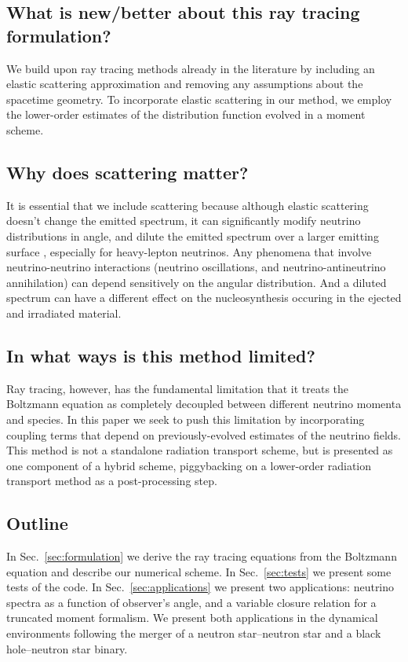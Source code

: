 \documentclass[aps,prd,twocolumn,superscriptaddress,groupedaddress]{revtex4}
\newcommand{\todo}[1]{\marginpar{\tiny{\textcolor{red}{#1}}}}
\begin{document}
\subsection{What is new/better about this ray tracing formulation?}
We build upon ray tracing methods already in the literature
\citep{hari2010-gr_nunubar_collapsar, youn2012-gr_radiative_transfer,
  kova2011-gr_ray_tracing, ?}
by including an elastic scattering approximation
\todo{and perhaps inelastic}
and removing any assumptions about the spacetime geometry.
To incorporate elastic scattering in our method, we employ the lower-order
estimates of the distribution function evolved in a moment scheme.

\subsection{Why does scattering matter?}
It is essential that we include scattering because although elastic scattering
doesn't change the emitted spectrum, it can significantly modify neutrino
distributions in angle, and dilute the emitted spectrum over a larger emitting
surface \citep{pere2016-asl}, especially for heavy-lepton neutrinos.
Any phenomena that involve neutrino-neutrino interactions (neutrino oscillations,
and neutrino-antineutrino annihilation) can depend sensitively on the angular
distribution.
And a diluted spectrum can have a different effect on the nucleosynthesis
occuring in the ejected and irradiated material.

\subsection{In what ways is this method limited?}
Ray tracing, however, has the fundamental limitation that it treats the
Boltzmann equation as completely decoupled between different neutrino momenta
and species. In this paper we seek to push this limitation by incorporating
coupling terms that depend on previously-evolved estimates of the neutrino
fields. This method is not a standalone radiation transport scheme, but
is presented as one component of a  hybrid scheme, piggybacking on a
lower-order radiation transport method as a post-processing step.

\subsection{Outline}
In Sec.~\ref{sec:formulation} we derive the ray tracing equations from the
Boltzmann equation and describe our numerical scheme.
In Sec.~\ref{sec:tests} we present some tests of the code.
In Sec.~\ref{sec:applications} we present two applications:
neutrino spectra as a function of observer's angle, and
a variable closure relation for a truncated moment formalism.
We present both applications in the dynamical environments following the merger
of a neutron star--neutron star and a black hole--neutron star binary.
\end{document}
